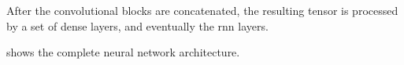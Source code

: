 
After the convolutional blocks are concatenated, the
resulting tensor is processed by a set of dense layers, and
eventually the \gls{rnn} layers.

 shows the complete neural network architecture.

